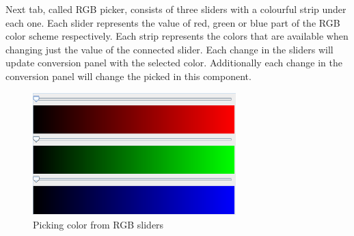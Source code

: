 \documentclass[titlepage]{article}
\begin{document}
Next tab, called RGB picker, consists of three sliders with a colourful strip
under each one. Each slider represents the value of red, green or blue part of
the RGB color scheme respectively. Each strip represents the colors that are
available when changing just the value of the connected slider. Each change in
the sliders will update conversion panel with the selected color. Additionally
each change in the conversion panel will change the picked in this component.

\begin{figure}[!htb]
	\centering
	\includegraphics[width=0.7\textwidth]{img/rgbpick.png} 
	\caption{Picking color from RGB sliders}
	\label{fig:rgb_slider}
\end{figure}


\end{document}

